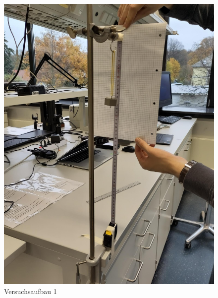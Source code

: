 \documentclass[
  9pt,
]{article}
\begin{document}
\begin{figure}
\centering
\includegraphics[width=\textwidth,height=0.2\textheight]{Bilder/V1B2.jpeg}
\caption{Versuchsaufbau 1}
\end{figure}
\end{document}
